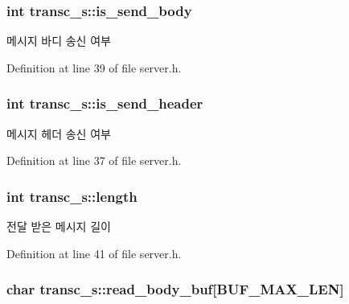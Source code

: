 \hypertarget{structtransc__s_a5dc3cf081807fe042565a3bcadc1a653}{
\subsubsection[{is\-\_\-send\-\_\-body}]{\setlength{\rightskip}{0pt plus 5cm}int transc\-\_\-s\-::is\-\_\-send\-\_\-body}}\label{structtransc__s_a5dc3cf081807fe042565a3bcadc1a653}


메시지 바디 송신 여부 



Definition at line 39 of file server.\-h.

\hypertarget{structtransc__s_a7178f7c31cbe28f06470575d955e09d1}{
\subsubsection[{is\-\_\-send\-\_\-header}]{\setlength{\rightskip}{0pt plus 5cm}int transc\-\_\-s\-::is\-\_\-send\-\_\-header}}\label{structtransc__s_a7178f7c31cbe28f06470575d955e09d1}


메시지 헤더 송신 여부 



Definition at line 37 of file server.\-h.

\hypertarget{structtransc__s_a636aafe11d1ad736f2f640608b977686}{
\subsubsection[{length}]{\setlength{\rightskip}{0pt plus 5cm}int transc\-\_\-s\-::length}}\label{structtransc__s_a636aafe11d1ad736f2f640608b977686}


전달 받은 메시지 길이 



Definition at line 41 of file server.\-h.

\hypertarget{structtransc__s_aaca1c744c081704ab3b0294a7755cdaf}{
\subsubsection[{read\-\_\-body\-\_\-buf}]{\setlength{\rightskip}{0pt plus 5cm}char transc\-\_\-s\-::read\-\_\-body\-\_\-buf\mbox{[}{\bf B\-U\-F\-\_\-\-M\-A\-X\-\_\-\-L\-E\-N}\mbox{]}}}\label{structtransc__s_aaca1c744c081704ab3b0294a7755cdaf}


